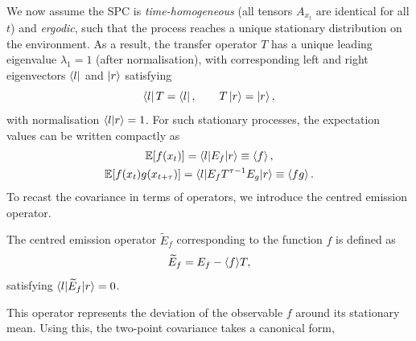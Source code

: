 We now assume the SPC is \emph{time-homogeneous} (all tensors \(A_{x_t}\) are identical for all \(t\)) and \emph{ergodic}, such that the process reaches a unique stationary distribution on the environment. As a result, the transfer operator \(T\) has a unique leading eigenvalue \(\lambda_1 = 1\) (after normalisation), with corresponding left and right eigenvectors \(\bra{l}\) and \(\ket{r}\) satisfying
\begin{equation}
    \bra{l} T = \bra{l},
    \qquad
    T \ket{r} = \ket{r},
\end{equation}
with normalisation \(\braket{l|r} = 1\). For such stationary processes, the expectation values can be written compactly as
\begin{equation}
    \begin{gathered}
        \mathbb{E}[f(x_t)] = \braket{l|E_f|r} \equiv \braket{f}, \\
        \mathbb{E}[f(x_t)g(x_{t+\tau})] = \braket{l|E_f T^{\tau - 1} E_g|r} \equiv \braket{fg}.
    \end{gathered}
\end{equation}
To recast the covariance in terms of operators, we introduce the centred emission operator.
\begin{definition}
    The centred emission operator \(\widetilde{E}_f\) corresponding to the function \(f\) is defined as
    \begin{equation}
        \widetilde{E}_f = E_f - \braket{f}\!T,
    \end{equation}
    satisfying \(\braket{l|\widetilde{E}_f|r} = 0\).
\end{definition}
This operator represents the deviation of the observable \(f\) around its stationary mean. Using this, the two-point covariance takes a canonical form,
